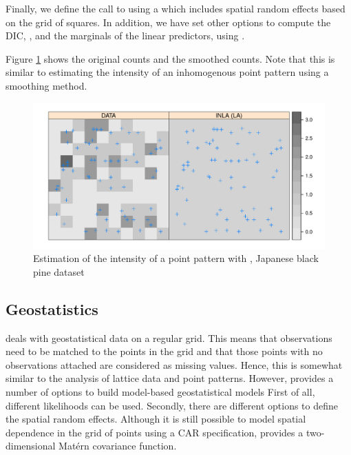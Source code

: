 \documentclass[article]{jss}
\begin{document}
Finally, we define the call to  using a  which
includes spatial random effects based on the grid of squares.  In addition, we
have set other options to compute the DIC,
, and the marginals of the linear
predictors, using .

\begin{Schunk}
\end{Schunk}
\noindent
Figure \ref{fig:sppa} shows the original counts and the smoothed counts.  Note
that this is similar to estimating the intensity of an inhomogenous point
pattern using a smoothing method.


\begin{figure}[h]
\begin{center}
\includegraphics{spatial_inla-008}
\end{center}
\caption{Estimation of the intensity of a point pattern with , 
Japanese black pine dataset}
\label{fig:sppa}
\end{figure}



\subsection{Geostatistics}


 deals with geostatistical data on a regular grid. This means
that observations need to be matched to the points in the grid and that those
points with no observations attached are considered as missing values.
Hence, this is somewhat similar to the analysis of lattice data and point
patterns. However,  provides a number of options to build 
model-based geostatistical models \citet{DiggleRibeiro:2007} First
of all, different likelihoods can be used. Secondly, there are different
options to define the spatial random effects. Although it is still possible
to model spatial dependence in the grid of points using a CAR specification,
 provides a two-dimensional Mat\'ern covariance function. 
\end{document}

